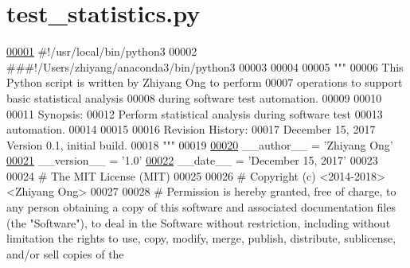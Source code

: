 \hypertarget{test__statistics_8py_source}{}\section{test\+\_\+statistics.\+py}
\label{test__statistics_8py_source}

\begin{DoxyCode}
\hypertarget{test__statistics_8py_source_l00001}{}\hyperlink{namespacestatistics_1_1test__statistics}{00001} \textcolor{comment}{#!/usr/local/bin/python3}
00002 \textcolor{comment}{###!/Users/zhiyang/anaconda3/bin/python3}
00003 
00004 
00005 \textcolor{stringliteral}{"""}
00006 \textcolor{stringliteral}{    This Python script is written by Zhiyang Ong to perform}
00007 \textcolor{stringliteral}{        operations to support basic statistical analysis}
00008 \textcolor{stringliteral}{        during software test automation.}
00009 \textcolor{stringliteral}{}
00010 \textcolor{stringliteral}{}
00011 \textcolor{stringliteral}{    Synopsis:}
00012 \textcolor{stringliteral}{    Perform statistical analysis during software test}
00013 \textcolor{stringliteral}{        automation.}
00014 \textcolor{stringliteral}{}
00015 \textcolor{stringliteral}{}
00016 \textcolor{stringliteral}{    Revision History:}
00017 \textcolor{stringliteral}{    December 15, 2017           Version 0.1, initial build.}
00018 \textcolor{stringliteral}{"""}
00019 
\hypertarget{test__statistics_8py_source_l00020}{}\hyperlink{namespacestatistics_1_1test__statistics_a188ace18635f13c413bf14347b4eb7f0}{00020} \_\_author\_\_ = \textcolor{stringliteral}{'Zhiyang Ong'}
\hypertarget{test__statistics_8py_source_l00021}{}\hyperlink{namespacestatistics_1_1test__statistics_ad5c236202b813efcbc877e38a20d7f07}{00021} \_\_version\_\_ = \textcolor{stringliteral}{'1.0'}
\hypertarget{test__statistics_8py_source_l00022}{}\hyperlink{namespacestatistics_1_1test__statistics_a271285b175d250f7888c9b41fa124abd}{00022} \_\_date\_\_ = \textcolor{stringliteral}{'December 15, 2017'}
00023 
00024 \textcolor{comment}{#   The MIT License (MIT)}
00025 
00026 \textcolor{comment}{#   Copyright (c) <2014-2018> <Zhiyang Ong>}
00027 
00028 \textcolor{comment}{#   Permission is hereby granted, free of charge, to any person obtaining a copy of this software and
       associated documentation files (the "Software"), to deal in the Software without restriction, including without
       limitation the rights to use, copy, modify, merge, publish, distribute, sublicense, and/or sell copies of the
}
\end{DoxyCode}
